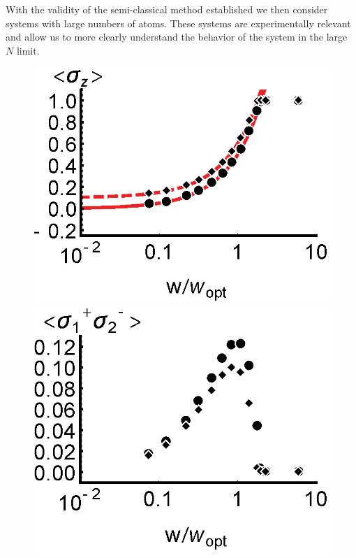\documentclass[aps,
twocolumn,
showpacs,
superscriptaddress,groupedaddress]{revtex4}
\begin{document}
With the validity of the semi-classical method established we then
consider systems with large numbers of atoms.  These systems are
experimentally relevant and allow us to more clearly understand the
behavior of the system in the large $N$ limit.

\begin{figure}
\begin{center}
	\includegraphics[scale =0.445] {N10000SZ.eps}
	\hspace{-5.0mm} \includegraphics[scale =0.445] {N10000SPSM.eps}

\end{center}
\end{figure}
\end{document}
